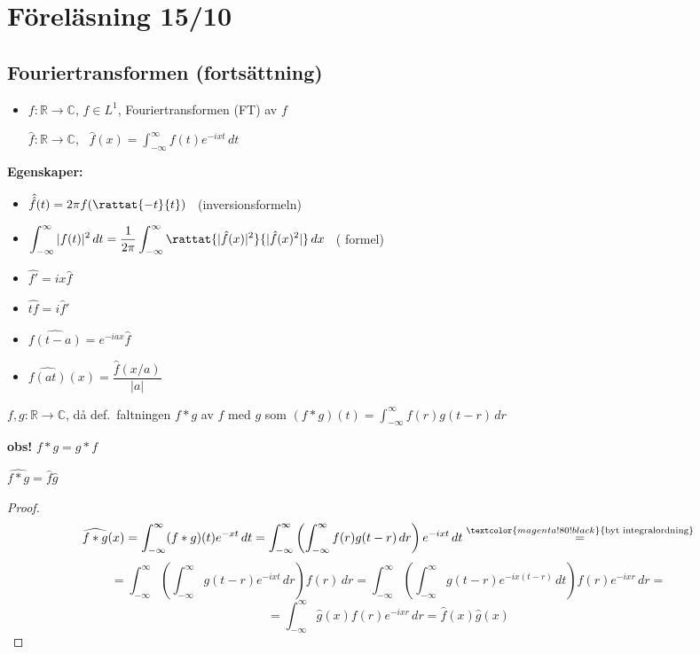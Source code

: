 \section{Föreläsning 15/10}
\subsection{Fouriertransformen (fortsättning)}
\begin{itemize}
  \item $f : \mathbb{R} \to \mathbb{C}$, $f \in L^1$, Fouriertransformen (FT) av $f$

  $\hat{f} : \mathbb{R} \to \mathbb{C}$, \ $\hat{f}(x) = \displaystyle\int_{-\infty}^\infty f(t)e^{-ixt}\,dt$
\end{itemize}

\textbf{Egenskaper:}
\begin{itemize}
  \item $\hat{\hat{f}}(t) = 2\pi f(\rattat{-t}{t})$ \ (inversionsformeln)
  \item $\displaystyle\int_{-\infty}^\infty |f(t)|^2\,dt = \frac{1}{2\pi} \int_{-\infty}^\infty \rattat{|\hat{f}(x)|^2}{|\hat{f}(x)^2|}\,dx$ \ ( formel)
  \item $\widehat{f'} = ix\hat{f}$
  \item $\widehat{tf} = i\hat{f}'$
  \item $\widehat{f(t - a)} = e^{-iax}\hat{f}$
  \item $\widehat{f(at)}(x) = \dfrac{\hat{f}(x/a)}{|a|}$
\end{itemize}

\begin{definition}
$f, g : \mathbb{R} \to \mathbb{C}$, då def.\ faltningen $f * g$ av $f$ med $g$ som $(f * g)(t) = \displaystyle\int_{-\infty}^\infty f(r)g(t - r)\,dr$
\end{definition}

\textcolor{red!70!black}{\textbf{obs!}} $f * g = g * f$

\begin{theorem}[Sats 2.4.F]
$\widehat{f * g} = \hat{f}\hat{g}$
\end{theorem}
\begin{proof}
\[ \widehat{f * g}(x) = \int_{-\infty}^\infty (f * g)(t)e^{-xt}\,dt = \int_{-\infty}^\infty \left( \int_{-\infty}^\infty f(r)g(t - r)\,dr \right) e^{-ixt}\,dt \overset{\textcolor{magenta!80!black}{\text{byt integralordning}}}{=} \]
\[ = \int_{-\infty}^\infty \left( \int_{-\infty}^\infty g(t - r)e^{-ixt}\,dr \right) f(r)\,dr = \int_{-\infty}^\infty \left( \int_{-\infty}^\infty g(t - r)e^{-ix(t - r)}\,dt \right) f(r)e^{-ixr}\,dr = \]
\[ = \int_{-\infty}^\infty \hat{g}(x)f(r)e^{-ixr}\,dr = \hat{f}(x)\hat{g}(x) \]
\end{proof}
